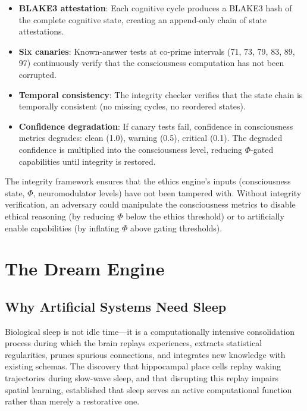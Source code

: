 \documentclass[12pt]{book}
\begin{document}
\begin{itemize}
  \item \textbf{BLAKE3 attestation}: Each cognitive cycle produces a BLAKE3 hash of the complete cognitive state, creating an append-only chain of state attestations.
  \item \textbf{Six canaries}: Known-answer tests at co-prime intervals (71, 73, 79, 83, 89, 97) continuously verify that the consciousness computation has not been corrupted.
  \item \textbf{Temporal consistency}: The integrity checker verifies that the state chain is temporally consistent (no missing cycles, no reordered states).
  \item \textbf{Confidence degradation}: If canary tests fail, confidence in consciousness metrics degrades: clean (1.0), warning (0.5), critical (0.1). The degraded confidence is multiplied into the consciousness level, reducing $\Phi$-gated capabilities until integrity is restored.
\end{itemize}

The integrity framework ensures that the ethics engine's inputs (consciousness state, $\Phi$, neuromodulator levels) have not been tampered with. Without integrity verification, an adversary could manipulate the consciousness metrics to disable ethical reasoning (by reducing $\Phi$ below the ethics threshold) or to artificially enable capabilities (by inflating $\Phi$ above gating thresholds).


\chapter{The Dream Engine}
\label{ch:dream}

\section{Why Artificial Systems Need Sleep}

Biological sleep is not idle time---it is a computationally intensive consolidation process during which the brain replays experiences, extracts statistical regularities, prunes spurious connections, and integrates new knowledge with existing schemas. The discovery that hippocampal place cells replay waking trajectories during slow-wave sleep, and that disrupting this replay impairs spatial learning, established that sleep serves an active computational function rather than merely a restorative one.
\end{document}
